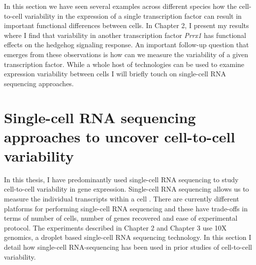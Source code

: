 In this section we have seen several examples across different species how the cell-to-cell variability in the expression of a single transcription factor can result in important functional differences between cells. In Chapter 2, I present my results where I find that variability in another transcription factor \emph{Prrx1} has functional effects on the hedgehog signaling response. An important follow-up question that emerges from these observations is how can we measure the variability of a given transcription factor. While a whole host of technologies can be used to examine expression variability between cells I will briefly touch on single-cell RNA sequencing approaches.

\section{Single-cell RNA sequencing approaches to uncover cell-to-cell variability}

In this thesis, I have predominantly used single-cell RNA sequencing to study cell-to-cell variability in gene expression. Single-cell RNA sequencing allows us to measure the individual transcripts within a cell \cite{macosko2015c}. There are currently different platforms for performing single-cell RNA sequencing and these have trade-offs in terms of number of cells, number of genes recovered and ease of experimental protocol. The experiments described in Chapter 2 and Chapter 3 use 10X genomics, a droplet based single-cell RNA sequencing technology. In this section I detail how single-cell RNA-sequencing has been used in prior studies of cell-to-cell variability.

